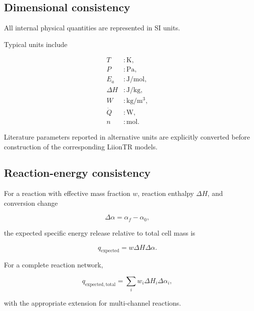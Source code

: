 \subsection{Dimensional consistency}

All internal physical quantities are represented in SI units.

Typical units include

\begin{align}
    T &: \si{\kelvin},
    \\
    P &: \si{\pascal},
    \\
    E_a &: \si{\joule\per\mole},
    \\
    \Delta H &: \si{\joule\per\kilogram},
    \\
    W &: \si{\kilogram\per\meter\cubed},
    \\
    \dot{Q} &: \si{\watt},
    \\
    n &: \si{\mole}.
\end{align}

Literature parameters reported in alternative units are explicitly
converted before construction of the corresponding LiionTR models.


\subsection{Reaction-energy consistency}

For a reaction with effective mass fraction $w$, reaction enthalpy
$\Delta H$, and conversion change

\begin{equation}
    \Delta \alpha
    =
    \alpha_f-\alpha_0,
\end{equation}

the expected specific energy release relative to total cell mass is

\begin{equation}
    q_{\mathrm{expected}}
    =
    w
    \Delta H
    \Delta\alpha.
    \label{eq:verification_expected_energy}
\end{equation}

For a complete reaction network,

\begin{equation}
    q_{\mathrm{expected,total}}
    =
    \sum_i
    w_i
    \Delta H_i
    \Delta\alpha_i,
    \label{eq:verification_total_energy}
\end{equation}

with the appropriate extension for multi-channel reactions.

